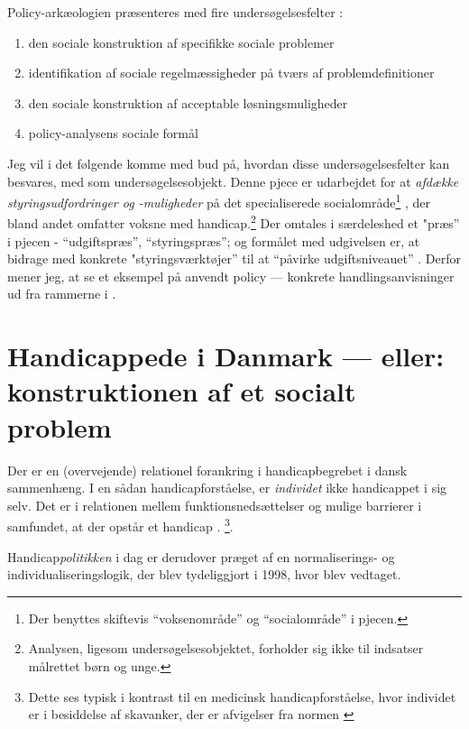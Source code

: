Policy-arkæologien præsenteres med fire undersøgelsesfelter \autocite[s. 300]{scheurichPolicyArchaeologyNew1994}:
\begin{enumerate}
  \item
    den sociale konstruktion af specifikke sociale problemer
  \item
    identifikation af sociale regelmæssigheder på tværs af problemdefinitioner
  \item
    den sociale konstruktion af acceptable løsningsmuligheder
  \item
    policy-analysens sociale formål
\end{enumerate}

Jeg vil i det følgende komme med bud på, hvordan disse undersøgelsesfelter kan besvares, med  som undersøgelsesobjekt.
Denne pjece er udarbejdet for at \textit{afdække styringsudfordringer og -muligheder} på det specialiserede socialområde\footnote{Der benyttes skiftevis “voksenområde” og “socialområde” i pjecen.} \autocite[s. 2]{klStyringAfDet2017}, der bland andet omfatter voksne med handicap.\footnote{Analysen, ligesom undersøgelsesobjektet, forholder sig ikke til indsatser målrettet børn og unge.}
Der omtales i særdeleshed et "præs” i pjecen - “udgiftspræs”, “styringspræs”; og formålet med udgivelsen er, at bidrage med konkrete "styringsværktøjer” til at “påvirke udgiftsniveauet” \autocite[s. 2, 3. m.fl.]{klStyringAfDet2017}.
Derfor mener jeg, at se et eksempel på anvendt policy — konkrete handlingsanvisninger ud fra rammerne i .

\section{Handicappede i Danmark — eller: konstruktionen af et socialt problem}
Der er en (overvejende) relationel forankring i handicapbegrebet i dansk sammenhæng.
I en sådan handicapforståelse, er \textit{individet} ikke handicappet i sig selv. Det er i relationen mellem funktionsnedsættelser og mulige barrierer i samfundet,  at der opstår et handicap \autocite[s. 41]{alma99122456944705763}.
\footnote{Dette ses typisk i kontrast til en medicinsk handicapforståelse, hvor individet er i besiddelse af skavanker, der er afvigelser fra normen \autocite[s. 37]{alma99122456944705763}}.

Handicap\textit{politikken} i dag er derudover præget af en normaliserings- og individualiseringslogik, der blev tydeliggjort i 1998, hvor  blev vedtaget.

